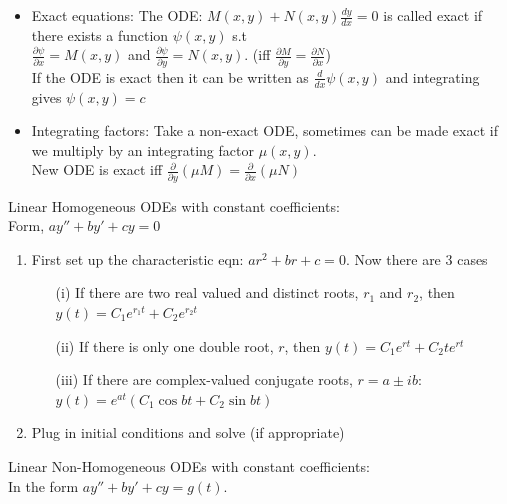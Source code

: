 \documentclass[10pt,landscape]{article}
\begin{document}
\begin{multicols}{2}
\begin{itemize}
\item Exact equations: The ODE: $M(x,y) + N(x,y)\frac{dy}{dx}=0$ is called exact if there exists a function $\psi(x,y)$ s.t\\ 
$\frac{\partial \psi}{\partial x}= M(x,y)$ and $\frac{\partial \psi}{\partial y}= N(x,y)$. (iff $\frac{\partial M}{\partial y} = \frac{\partial N}{\partial x}$) \\ If the ODE is exact then it can be written as $\frac{d}{dx}\psi(x,y)$ and integrating gives $\psi(x,y)=c$

\item Integrating factors: Take a non-exact ODE, sometimes can be made exact if we multiply by an integrating factor $\mu(x,y).$ \\ New ODE is exact iff $\frac{\partial}{\partial y}(\mu M)=\frac{\partial}{\partial x}(\mu N)$
\end{itemize}

Linear Homogeneous ODEs with constant coefficients: \\Form, $ay''+by'+cy=0$ 
\begin{enumerate}
    \item First set up the characteristic eqn: $ar^2+br+c=0$. Now there are 3 cases 
    \begin{enumerate}
        \item[(i)] If there are two real valued and distinct roots, $r_1$ and $r_2$, then $y(t)=C_1e^{r_1t}+C_2e^{r_2t}$

        \item[(ii)] If there is only one double root, $r$, then $y(t)=C_1e^{rt}+C_2te^{rt}$

        \item[(iii)] If there are complex-valued conjugate roots, $r=a\pm  ib$: $y(t)=e^{at}(C_1\cos{bt}+C_2\sin{bt})$
    \end{enumerate}

   \item Plug in initial conditions and solve (if appropriate)
    
\end{enumerate}

Linear Non-Homogeneous ODEs with constant coefficients:\\
In the form $ay''+by'+cy=g(t)$.


\end{multicols}
\end{document}
